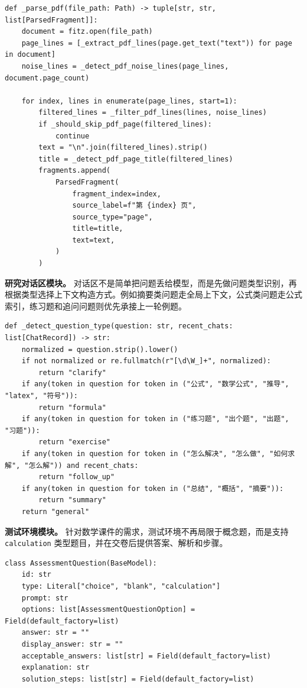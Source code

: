 \documentclass[UTF8,zihao=-4]{ctexart}
\begin{document}
\begin{lstlisting}[style=vibecode,caption={PDF 去噪与标题识别：解决目录噪声影响章节切分的问题},label={lst:pdf}]
def _parse_pdf(file_path: Path) -> tuple[str, str, list[ParsedFragment]]:
    document = fitz.open(file_path)
    page_lines = [_extract_pdf_lines(page.get_text("text")) for page in document]
    noise_lines = _detect_pdf_noise_lines(page_lines, document.page_count)

    for index, lines in enumerate(page_lines, start=1):
        filtered_lines = _filter_pdf_lines(lines, noise_lines)
        if _should_skip_pdf_page(filtered_lines):
            continue
        text = "\n".join(filtered_lines).strip()
        title = _detect_pdf_page_title(filtered_lines)
        fragments.append(
            ParsedFragment(
                fragment_index=index,
                source_label=f"第 {index} 页",
                source_type="page",
                title=title,
                text=text,
            )
        )
\end{lstlisting}

\textbf{研究对话区模块。} 对话区不是简单把问题丢给模型，而是先做问题类型识别，再根据类型选择上下文构造方式。例如摘要类问题走全局上下文，公式类问题走公式索引，练习题和追问问题则优先承接上一轮例题。

\begin{lstlisting}[style=vibecode,caption={研究对话区问题类型识别：决定检索与回答策略},label={lst:chat}]
def _detect_question_type(question: str, recent_chats: list[ChatRecord]) -> str:
    normalized = question.strip().lower()
    if not normalized or re.fullmatch(r"[\d\W_]+", normalized):
        return "clarify"
    if any(token in question for token in ("公式", "数学公式", "推导", "latex", "符号")):
        return "formula"
    if any(token in question for token in ("练习题", "出个题", "出题", "习题")):
        return "exercise"
    if any(token in question for token in ("怎么解决", "怎么做", "如何求解", "怎么解")) and recent_chats:
        return "follow_up"
    if any(token in question for token in ("总结", "概括", "摘要")):
        return "summary"
    return "general"
\end{lstlisting}

\textbf{测试环境模块。} 针对数学课件的需求，测试环境不再局限于概念题，而是支持 \texttt{calculation} 类型题目，并在交卷后提供答案、解析和步骤。

\begin{lstlisting}[style=vibecode,caption={测试题生成逻辑：支持 calculation 类型},label={lst:assessment}]
class AssessmentQuestion(BaseModel):
    id: str
    type: Literal["choice", "blank", "calculation"]
    prompt: str
    options: list[AssessmentQuestionOption] = Field(default_factory=list)
    answer: str = ""
    display_answer: str = ""
    acceptable_answers: list[str] = Field(default_factory=list)
    explanation: str
    solution_steps: list[str] = Field(default_factory=list)
\end{lstlisting}
\end{document}
